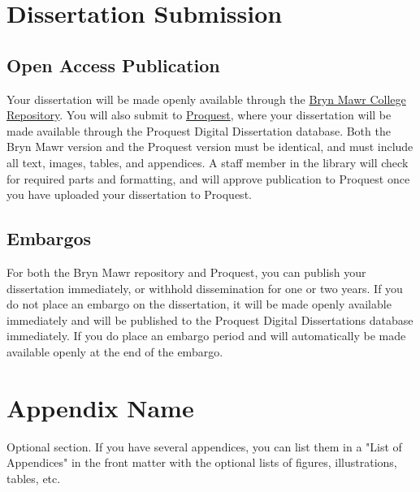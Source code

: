 \documentclass[12pt]{report}
\begin{document}
\chapter{Dissertation Submission}

\section{Open Access Publication}
Your dissertation will be made openly available through the \href{https://repository.brynmawr.edu/}{Bryn Mawr College Repository}. You will also submit to \href{https://www.proquest.com/}{Proquest}, where your dissertation will be made available through the Proquest Digital Dissertation database. Both the Bryn Mawr version and the Proquest version must be identical, and must include all text, images, tables, and appendices. A staff member in the library will check for required parts and formatting, and will approve publication to Proquest once you have uploaded your dissertation to Proquest.
\section{Embargos}
For both the Bryn Mawr repository and Proquest, you can publish your dissertation immediately, or withhold dissemination for one or two years. If you do not place an embargo on the dissertation, it will be made openly available immediately and will be published to the Proquest Digital Dissertations database immediately. If you do place an embargo period and will automatically be made available openly at the end of the embargo. 
\appendix
\chapter{Appendix Name}
Optional section. If you have several appendices, you can list them in a "List of Appendices" in the front matter with the optional lists of figures, illustrations, tables, etc.

\singlespacing
\printbibliography[heading=bibintoc, title={Bibliography}]
\end{document}
